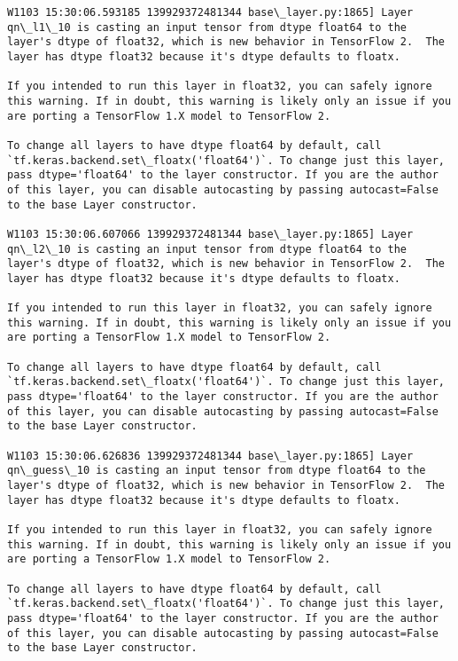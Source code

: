 \documentclass[11pt]{article}
\begin{document}
    \begin{Verbatim}[commandchars=\\\{\}]
W1103 15:30:06.593185 139929372481344 base\_layer.py:1865] Layer qn\_l1\_10 is casting an input tensor from dtype float64 to the layer's dtype of float32, which is new behavior in TensorFlow 2.  The layer has dtype float32 because it's dtype defaults to floatx.

If you intended to run this layer in float32, you can safely ignore this warning. If in doubt, this warning is likely only an issue if you are porting a TensorFlow 1.X model to TensorFlow 2.

To change all layers to have dtype float64 by default, call `tf.keras.backend.set\_floatx('float64')`. To change just this layer, pass dtype='float64' to the layer constructor. If you are the author of this layer, you can disable autocasting by passing autocast=False to the base Layer constructor.

W1103 15:30:06.607066 139929372481344 base\_layer.py:1865] Layer qn\_l2\_10 is casting an input tensor from dtype float64 to the layer's dtype of float32, which is new behavior in TensorFlow 2.  The layer has dtype float32 because it's dtype defaults to floatx.

If you intended to run this layer in float32, you can safely ignore this warning. If in doubt, this warning is likely only an issue if you are porting a TensorFlow 1.X model to TensorFlow 2.

To change all layers to have dtype float64 by default, call `tf.keras.backend.set\_floatx('float64')`. To change just this layer, pass dtype='float64' to the layer constructor. If you are the author of this layer, you can disable autocasting by passing autocast=False to the base Layer constructor.

W1103 15:30:06.626836 139929372481344 base\_layer.py:1865] Layer qn\_guess\_10 is casting an input tensor from dtype float64 to the layer's dtype of float32, which is new behavior in TensorFlow 2.  The layer has dtype float32 because it's dtype defaults to floatx.

If you intended to run this layer in float32, you can safely ignore this warning. If in doubt, this warning is likely only an issue if you are porting a TensorFlow 1.X model to TensorFlow 2.

To change all layers to have dtype float64 by default, call `tf.keras.backend.set\_floatx('float64')`. To change just this layer, pass dtype='float64' to the layer constructor. If you are the author of this layer, you can disable autocasting by passing autocast=False to the base Layer constructor.


\end{Verbatim}
\end{document}

